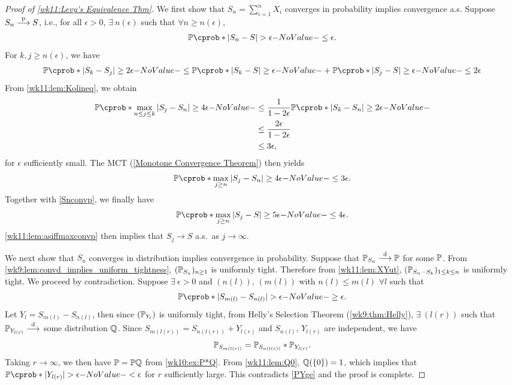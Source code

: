 \documentclass[12pt]{article}
\begin{document}
\begin{proof}[Proof of \cref{wk11:Levy's Equivalence Thm}]
We first show that $S_n=\sum_{i=1}^n X_i$ converges in probability implies convergence a.s. Suppose $S_n \stackrel{\mathrm{p}}{\longrightarrow} S$, i.e., for all $\epsilon >0$, $\exists\ n(\epsilon)$ such that $\forall n\geq n(\epsilon)$,
\begin{align}\label{Snconvp}
\P(|S_n-S|>\epsilon) \leq \epsilon.
\end{align}
For $k,j\geq n(\epsilon)$, we have
\begin{align*}
\P(|S_k-S_j|\geq 2\epsilon) \leq \P(|S_k-S|\geq\epsilon) +\P(|S_j-S|\geq\epsilon) \leq 2\epsilon
\end{align*}
From \cref{wk11:lem:Kolineq}, we obtain
\begin{align*}
\P(\max_{n\leq j \leq k} |S_j-S_n| \geq 4\epsilon)
&\leq \ofrac{1-2\epsilon} \P(|S_k - S_n|\geq 2\epsilon)\\
&\leq \frac{2\epsilon}{1-2\epsilon}\\
&\leq 3\epsilon,
\end{align*}
for $\epsilon$ sufficiently small. The MCT (\cref{Monotone Convergence Theorem}) then yields
\begin{align*}
\P(\max_{j \geq n} |S_j-S_n| \geq 4\epsilon) \leq 3\epsilon.
\end{align*}
Together with \cref{Snconvp}, we finally have
\begin{align*}
\P(\max_{j \geq n} |S_j-S| \geq 5\epsilon) \leq 4\epsilon.
\end{align*} 
\cref{wk11:lem:asiffmaxconvp} then implies that $S_j \to S$ a.s.\ as $j\to\infty$.

We next show that $S_n$ converges in distribution implies convergence in probability. Suppose that $\P_{S_n} \convd \P$ for some $\P$. From \cref{wk9:lem:convd_implies_uniform_tightness}, $(\P_{S_n})_{n\geq1}$ is uniformly tight. Therefore from \cref{wk11:lem:XYut}, $(\P_{S_n-S_k})_{1\leq k\leq n}$ is uniformly tight. We proceed by contradiction. Suppose $\exists\ \epsilon>0$ and $(n(l))$, $(m(l))$ with $n(l)\leq m(l)$ $\forall l$ such that
\begin{align}\label{PYge}
\P(|S_{m(l)}-S_{n(l)}|>\epsilon) \geq \epsilon.
\end{align}
Let $Y_l=S_{m(l)}-S_{n(l)}$, then since $(\P_{Y_l})$ is uniformly tight, from Helly's Selection Theorem (\cref{wk9:thm:Helly}), $\exists\ (l(r))$ such that $\P_{Y_{l(r)}} \convd$ some distribution $\mathbb{Q}$. Since $S_{m(l(r))}=S_{n(l(r))}+Y_{l(r)}$ and $S_{n(l)}$, $Y_{l(r)}$ are independent, we have
\begin{align*}
\P_{S_{m(l(r))}} = \P_{S_{n(l(r))}}*\P_{Y_{l(r)}}.
\end{align*}
Taking $r\to\infty$, we then have $\P = \P*\bbQ$ from \cref{wk10:ex:P*Q}. From \cref{wk11:lem:Q0}, $\mathbb{Q}(\{0\})=1$, which implies that $\P(|Y_{l(r)}|>\epsilon) <\epsilon$ for $r$ sufficiently large. This contradicts \cref{PYge} and the proof is complete.
\end{proof}
\end{document}
